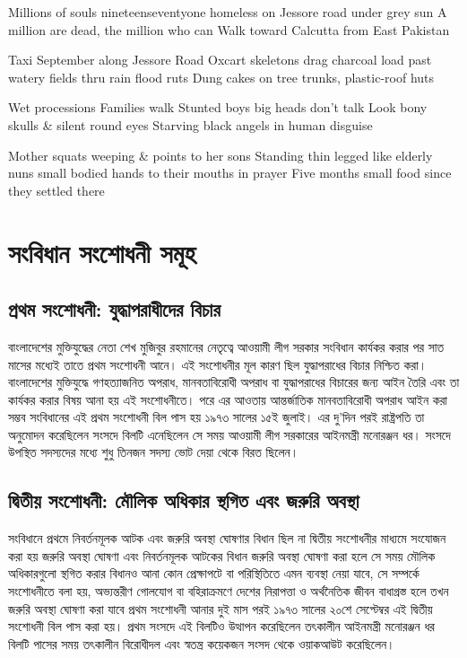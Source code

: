 \documentclass[11pt]{article}
\begin{document}
Millions of souls nineteenseventyone
homeless on Jessore road under grey sun
A million are dead, the million who can
Walk toward Calcutta from East Pakistan

Taxi September along Jessore Road
Oxcart skeletons drag charcoal load
past watery fields thru rain flood ruts
Dung cakes on tree trunks, plastic-roof huts

Wet processions Families walk
Stunted boys big heads don't talk
Look bony skulls \& silent round eyes
Starving black angels in human disguise

Mother squats weeping \& points to her sons
Standing thin legged like elderly nuns
small bodied hands to their mouths in prayer
Five months small food since they settled there

\section{সংবিধান সংশোধনী সমূহ}
\label{sec:org0e74295}
\subsection{প্রথম সংশোধনী: যুদ্ধাপরাধীদের বিচার}
\label{sec:orgc84739c}
বাংলাদেশের মুক্তিযুদ্ধের নেতা শেখ মুজিবুর রহমানের নেতৃত্বে আওয়ামী
লীগ সরকার সংবিধান কার্যকর করার পর সাত মাসের মধ্যেই তাতে প্রথম
সংশোধনী আনে। এই সংশোধনীর মূল কারণ ছিল যুদ্ধাপরাধের বিচার নিশ্চিত
করা। বাংলাদেশের মুক্তিযুদ্ধে গণহত্যাজনিত অপরাধ, মানবতাবিরোধী
অপরাধ বা যুদ্ধাপরাধের বিচারের জন্য আইন তৈরি এবং তা কার্যকর করার
বিষয় আনা হয় এই সংশোধনীতে। পরে এর আওতায় আন্তর্জাতিক
মানবতাবিরোধী অপরাধ আইন করা সম্ভব সংবিধানের এই প্রথম সংশোধনী
বিল পাস হয় ১৯৭৩ সালের ১৫ই জুলাই। এর দু'দিন পরই রাষ্ট্রপতি তা
অনুমোদন করেছিলেন সংসদে বিলটি এনেছিলেন সে সময় আওয়ামী লীগ
সরকারের আইনমন্ত্রী মনোরঞ্জন ধর। সংসদে উপস্থিত সদস্যদের মধ্যে শুধু
তিনজন সদস্য ভোট দেয়া থেকে বিরত ছিলেন।


\subsection{দ্বিতীয় সংশোধনী: মৌলিক অধিকার স্থগিত এবং জরুরি অবস্থা}
\label{sec:org35f269b}
সংবিধানে প্রথমে নিবর্তনমূলক আটক এবং জরুরি অবস্থা ঘোষণার বিধান ছিল
না দ্বিতীয় সংশোধনীর মাধ্যমে সংযোজন করা হয় জরুরি অবস্থা ঘোষণা এবং
নিবর্তনমূলক আটকের বিধান জরুরি অবস্থা ঘোষণা করা হলে সে সময় মৌলিক
অধিকারগুলো স্থগিত করার বিধানও আনা কোন প্রেক্ষাপটে বা পরিস্থিতিতে
এমন ব্যবস্থা নেয়া যাবে, সে সম্পর্কে সংশোধনীতে বলা হয়, অভ্যন্তরীণ
গোলযোগ বা বহিরাক্রমণে দেশের নিরাপত্তা ও অর্থনৈতিক জীবন বাধাগ্রস্ত
হলে তখন জরুরি অবস্থা ঘোষণা করা যাবে প্রথম সংশোধনী আনার দুই মাস
পরই ১৯৭৩ সালের ২০শে সেপ্টেম্বর এই দ্বিতীয় সংশোধনী বিল পাস করা
হয়। প্রথম সংসদে এই বিলটিও উত্থাপন করেছিলেন তৎকালীন আইনমন্ত্রী
মনোরঞ্জন ধর বিলটি পাসের সময় তৎকালীন বিরোধীদল এবং স্বতন্ত্র
কয়েকজন সংসদ থেকে ওয়াকআউট করেছিলেন।
\end{document}
